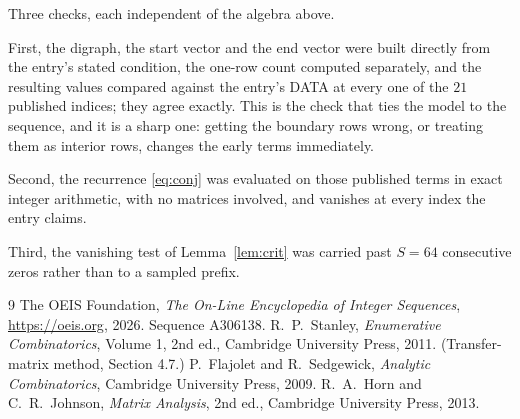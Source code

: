 \documentclass[11pt,a4paper]{article}
\theoremstyle{plain}
\theoremstyle{definition}
\begin{document}
Three checks, each independent of the algebra above.

First, the digraph, the start vector and the end vector were built directly from the
entry's stated condition, the one-row count computed separately, and the resulting values
compared against the entry's DATA at every one of the $21$ published indices; they
agree exactly. This is the check that ties the model to the sequence, and it is a sharp one:
getting the boundary rows wrong, or treating them as interior rows, changes the early terms
immediately.

Second, the recurrence \eqref{eq:conj} was evaluated on those published terms in exact
integer arithmetic, with no matrices involved, and vanishes at every index the entry claims.

Third, the vanishing test of Lemma~\ref{lem:crit} was carried past $S=64$ consecutive
zeros rather than to a sampled prefix.

\begin{thebibliography}{9}
 The OEIS Foundation, \emph{The On-Line Encyclopedia of Integer
Sequences}, \url{https://oeis.org}, 2026. Sequence A306138.
 R.~P.~Stanley, \emph{Enumerative Combinatorics}, Volume 1, 2nd ed.,
Cambridge University Press, 2011. (Transfer-matrix method, Section 4.7.)
 P.~Flajolet and R.~Sedgewick, \emph{Analytic Combinatorics}, Cambridge
University Press, 2009.
 R.~A.~Horn and C.~R.~Johnson, \emph{Matrix Analysis}, 2nd ed., Cambridge
University Press, 2013.
\end{thebibliography}
\end{document}
